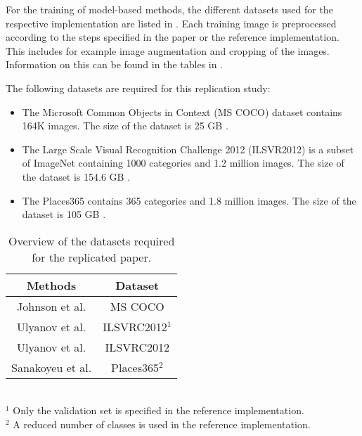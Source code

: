 For the training of model-based methods, the different datasets used for the respective implementation are listed in . Each training image is preprocessed according to the steps specified in the paper or the reference implementation. This includes for example image augmentation and cropping of the images. Information on this can be found in the tables in .

The following datasets are required for this replication study:

\begin{itemize}
	\item The Microsoft Common Objects in Context (MS COCO) dataset contains 164K images. The size of the dataset is 25 GB \cite{LMB+2014}.
	\item The Large Scale Visual Recognition Challenge 2012 (ILSVR2012) is a subset of ImageNet containing 1000 categories and 1.2 million images. The size of the dataset is 154.6 GB \cite{RDS+2015}.
	\item The Places365 contains 365 categories and 1.8 million images. The size of the dataset is 105 GB \cite{ZLX+2014}.
\end{itemize}

\begin{table*}[t]
	\renewcommand{\arraystretch}{1.3}
	\caption{Overview of the datasets required for the replicated paper.}
	\label{tab:datasets}
	\centering
	\begin{tabular}{c|c}
		\hline
		\bfseries Methods & \bfseries Dataset\\
		\hline\hline
		Johnson et al. \cite{JAL2016} & MS COCO  \\
		Ulyanov et al. \cite{ULVL2016} & ILSVRC2012$^1$ \\
		Ulyanov et al. \cite{UVL2017} & ILSVRC2012 \\
		Sanakoyeu et al. \cite{SKLO2018} & Places365$^2$\\
		\hline
	\end{tabular}
\footnotesize{
	\\$^1$ Only the validation set is specified in the reference implementation.
	\\$^2$ A reduced number of classes is used in the reference implementation.
}
\end{table*}

